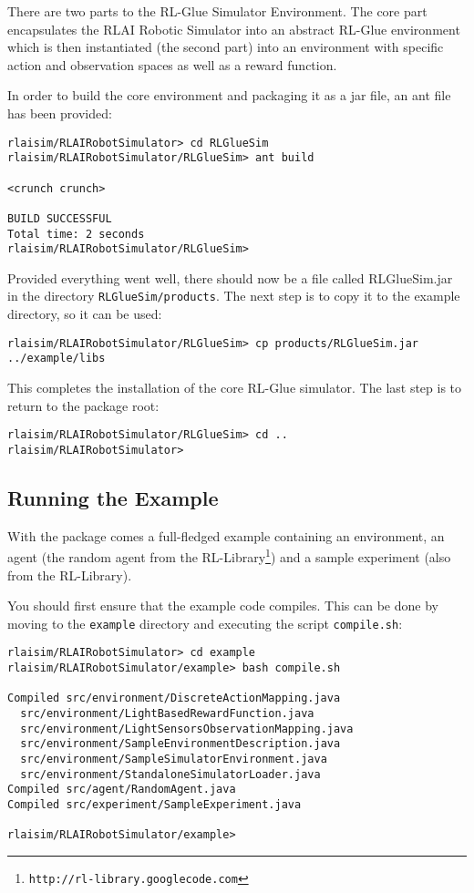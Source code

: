 \documentclass[12pt]{article}
\newcommand{\code}[1]{\texttt{#1}}
\begin{document}
There are two parts to the RL-Glue Simulator Environment. The core part
encapsulates the RLAI Robotic Simulator into an abstract RL-Glue environment
which is then instantiated (the second part) into an environment with specific
action and observation spaces as well as a reward function.

In order to build the core environment and packaging it as a jar file, an
ant file has been provided:

\begin{verbatim}
rlaisim/RLAIRobotSimulator> cd RLGlueSim
rlaisim/RLAIRobotSimulator/RLGlueSim> ant build 

<crunch crunch>

BUILD SUCCESSFUL
Total time: 2 seconds
rlaisim/RLAIRobotSimulator/RLGlueSim>

\end{verbatim}

Provided everything went well, there should now be a file called RLGlueSim.jar
in the directory \code{RLGlueSim/products}. The next step is to copy it to
the example directory, so it can be used:

\begin{verbatim}
rlaisim/RLAIRobotSimulator/RLGlueSim> cp products/RLGlueSim.jar ../example/libs
\end{verbatim}

This completes the installation of the core RL-Glue simulator. The last
step is to return to the package root:

\begin{verbatim}
rlaisim/RLAIRobotSimulator/RLGlueSim> cd ..
rlaisim/RLAIRobotSimulator>
\end{verbatim}

\subsection{Running the Example}

With the package comes a full-fledged example containing an environment,
an agent (the random agent from the 
RL-Library\footnote{\code{http://rl-library.googlecode.com}}) and a 
sample experiment (also from the RL-Library). 

You should first ensure that the example code compiles. This can be done
by moving to the \code{example} directory and executing the script
\code{compile.sh}:

\begin{verbatim}
rlaisim/RLAIRobotSimulator> cd example
rlaisim/RLAIRobotSimulator/example> bash compile.sh

Compiled src/environment/DiscreteActionMapping.java 
  src/environment/LightBasedRewardFunction.java 
  src/environment/LightSensorsObservationMapping.java 
  src/environment/SampleEnvironmentDescription.java 
  src/environment/SampleSimulatorEnvironment.java 
  src/environment/StandaloneSimulatorLoader.java
Compiled src/agent/RandomAgent.java
Compiled src/experiment/SampleExperiment.java

rlaisim/RLAIRobotSimulator/example>
\end{verbatim}
\end{document}
